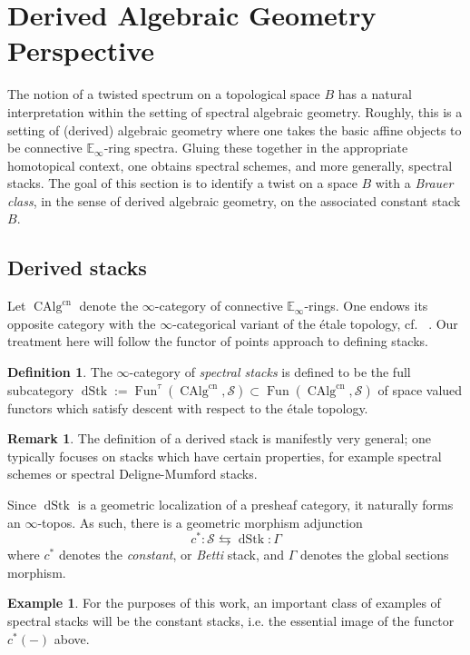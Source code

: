 \documentclass[10pt]{amsart}
\theoremstyle{plain}
\theoremstyle{definition}
\newtheorem{definition}[theorem]{Definition}
\newtheorem{example}[theorem]{Example}
\newtheorem{rmk}[theorem]{Remark}
\DeclareMathOperator{\Fun}{Fun}
\DeclareMathOperator{\CAlg}{CAlg}
\def\on{\operatorname}
\newcommand{\bE}{\mathbb{E}}
\newcommand{\cS}{\mathcal{S}}
\begin{document}
\section{Derived Algebraic Geometry Perspective} \label{derivedstory}

The notion of a twisted spectrum on a topological space $B$ has a natural interpretation within the setting of spectral algebraic geometry.
Roughly, this is a setting of (derived) algebraic geometry where one takes the basic affine objects to be connective $\bE_\infty$-ring spectra.
Gluing these together in the appropriate homotopical context, one obtains spectral schemes, and more generally, spectral stacks.
The goal of this section is to identify a twist on a space $B$ with a \emph{Brauer class}, in the sense of derived algebraic geometry, on the associated constant stack $B$.

\subsection{Derived stacks}

Let $\CAlg^{\on{cn}}$ denote the $\infty$-category of connective $\bE_\infty$-rings. One endows its opposite category with the $\infty$-categorical variant of the \'{e}tale topology, cf. ~\cite[Chapter 2.4]{HAG}. Our treatment here will follow the functor of points approach to defining stacks.

\begin{definition}
The $\infty$-category of \emph{spectral stacks}  is defined to be the full subcategory $\on{dStk}:= \Fun^{\tau}(\CAlg^{\on{cn}}, \cS) \subset \Fun(\CAlg^{\on{cn}}, \cS)$  of space valued functors which satisfy descent with respect to the \'{e}tale topology.
\end{definition}

\begin{rmk}
The definition of a derived stack is manifestly very general; one typically focuses on stacks which have certain properties, for example spectral schemes or spectral Deligne-Mumford stacks.
\end{rmk}

Since $\on{dStk}$ is a geometric localization of a presheaf category, it naturally forms an $\infty$-topos. As such, there is a geometric morphism adjunction
$$
c^* :\cS \leftrightarrows \on{dStk} : \Gamma
$$
where $c^*$ denotes the \emph{constant}, or \emph{Betti} stack, and $\Gamma$ denotes the global sections morphism.

\begin{example}
    For the purposes of this work, an important class of examples of spectral stacks will be the constant stacks, i.e. the essential image of the functor $c^*(-)$ above.
\end{example}
\end{document}
